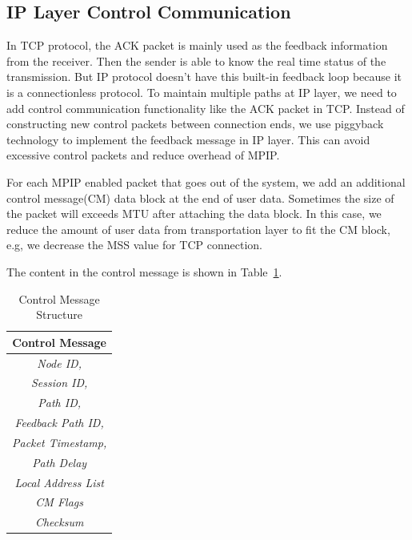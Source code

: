 \subsection{IP Layer Control Communication}
In TCP protocol, the ACK packet is mainly used as the feedback information from the receiver. Then the sender is able to know the real time status of the transmission. But IP protocol doesn't have this built-in feedback loop because it is a connectionless protocol. To maintain multiple paths at IP layer, we need to add control communication functionality like the ACK packet in TCP. Instead of constructing new control packets between connection ends, we use piggyback technology to implement the feedback message in IP layer. This can avoid excessive control packets and reduce overhead of MPIP.

For each MPIP enabled packet that goes out of the system, we add an additional control message(CM) data block at the end of user data.
Sometimes the size of the packet will exceeds MTU after attaching the data block. In this case, we reduce the amount of user data from transportation layer to fit the CM block, e.g, we decrease the MSS value for TCP connection.



The content in the control message is shown in Table~\ref{tb.cm}.

\begin{table}
\caption{\label{tb.cm}Control Message Structure}
\centering
\begin{tabular}{|c|}
\hline
Control Message \\
\hline
\emph{Node ID,} \\
\emph{Session ID,} \\
\emph{Path ID,} \\
\emph{Feedback Path ID,} \\
\emph{Packet Timestamp,} \\
\emph{Path Delay}\\
\emph{Local Address List}\\
\emph{CM Flags}\\
\emph{Checksum}\\
\hline
\end{tabular}
\end{table}

